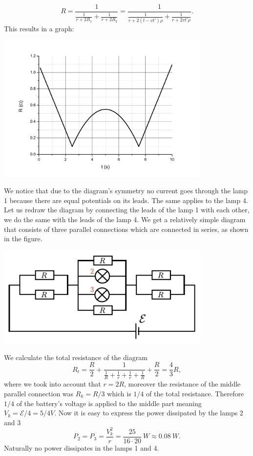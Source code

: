 \documentclass[11pt]{article}
\begin{document}
\[
R=\frac{1}{\frac{1}{r+2R_1}+\frac{1}{r+2R_2}}=\frac{1}{\frac{1}{r+2(l-vt')\rho}+\frac{1}{r+2vt'\rho}}.
\] 
This results in a graph:
\begin{center}
\includegraphics[width=300pt]{2012-v2g-08-rong_graafik}
\end{center}
\probend
\bigskip


\solueng
We notice that due to the diagram’s symmetry no current goes through the lamp 1 because there are equal potentials on its leads. The same applies to the lamp 4. Let us redraw the diagram by connecting the leads of the lamp 1 with each other, we do the same with the leads of the lamp 4. We get a relatively simple diagram that consists of three parallel connections which are connected in series, as shown in the figure.
\begin{center}
\includegraphics[width=0.8\textwidth]{2013-lahg-09-ahelLah}
\end{center}
We calculate the total resistance of the diagram
\[R_t = \frac{R}{2} + \frac{1}{\frac{1}{R}+\frac{1}{r}+\frac{1}{r}+\frac{1}{R}}+\frac{R}{2} =\frac{4}{3}R,\] 
where we took into account that $r=2R$, moreover the resistance of the middle parallel connection was $R_k=R/3$ which is $1/4$ of the total resistance. Therefore $1/4$ of the battery’s voltage is applied to the middle part meaning $V_k = \mathcal{E}/4 = 5/4\si{V}$. Now it is easy to express the power dissipated by the lamps 2 and 3
\[P_2=P_3=\frac{V_k^2}{r}=\frac{25}{16\cdot 20}\SI{}{W}\approx\SI{0,08}{W}.\] 
Naturally no power dissipates in the lamps 1 and 4.
\probend
\bigskip
\end{document}
